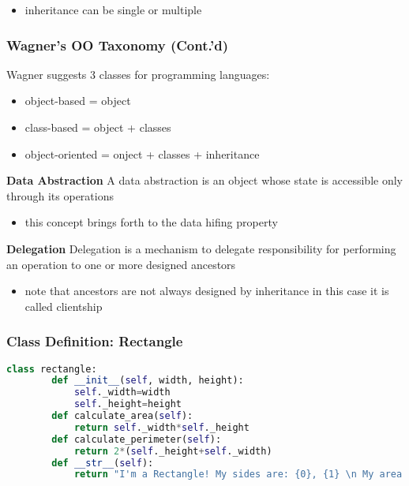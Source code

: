 \begin{itemize}
	\item  inheritance can be single or multiple
\end{itemize}

\subsubsection{Wagner’s OO Taxonomy (Cont.’d)}

Wagner suggests 3 classes for programming languages:

\begin{itemize}
	\item object-based = object
	\item class-based = object + classes
	\item object-oriented = onject + classes + inheritance
\end{itemize}

\textbf{Data Abstraction}
A data abstraction is an object whose state is accessible only through its operations

\begin{itemize}
	\item this concept brings forth to the data hifing property
\end{itemize}

\textbf{Delegation}
Delegation is a mechanism to delegate responsibility for performing an operation to one or more designed ancestors

\begin{itemize}
		\item note that ancestors are not always designed by inheritance in this case it is called clientship
\end{itemize}

\subsubsection{Class Definition: Rectangle}

\begin{lstlisting}[language=Python]
	class rectangle:
		def __init__(self, width, height):
			self._width=width
			self._height=height
		def calculate_area(self):
			return self._width*self._height
		def calculate_perimeter(self):
			return 2*(self._height+self._width)
		def __str__(self):
			return "I'm a Rectangle! My sides are: {0}, {1} \n My area is {2}".format(self._width,self._height, self.calculate_area())
\end{lstlisting}

